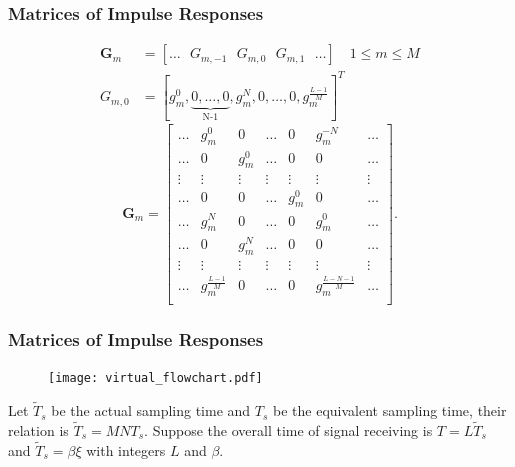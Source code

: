 \documentclass{beamer}
\begin{document}
\begin{frame}
\frametitle{Matrices of Impulse Responses}
\begin{align}
  \pmb{G}_m &=[\dots\text{ }G_{m,-1}\text{ }G_{m,0}\text{ }G_{m,1}\text{ }\dots]\quad 1\leq m\leq M \\
  G_{m,0} &=[g^0_m,\underbrace{0,\dots,0}_\text{N-1},g^N_m,0,\dots,0,g^{\frac{L-1}{M}}_m]^T
\end{align}
\begin{equation}
    \pmb{G}_m = \begin{bmatrix}
      \dots & g_m^0 & 0 & \dots & 0 & g_m^{-N} & \dots \\%
      \dots & 0 & g_m^0 & \dots & 0 & 0 & \dots \\%
      \vdots & \vdots & \vdots & \vdots & \vdots & \vdots & \vdots\\%
      \dots & 0 & 0 & \dots & g_m^0 & 0 & \dots \\%
      \dots & g_m^{N} & 0 & \dots & 0 & g_m^{0} & \dots \\%
      \dots & 0 & g_m^N & \dots & 0 & 0 & \dots \\%
      \vdots & \vdots & \vdots & \vdots & \vdots & \vdots & \vdots\\%
      \dots & g_m^{\frac{L-1}{M}} & 0 & \dots & 0 & g_m^{\frac{L-N-1}{M}} & \dots \\%
    \end{bmatrix}.
\end{equation}
\end{frame}

\begin{frame}
\frametitle{Matrices of Impulse Responses}
\begin{figure}
\texttt{[image: virtual\_flowchart.pdf]}
\end{figure}
Let $\tilde{T}_s$ be the actual sampling time and $T_s$ be the equivalent sampling time, their relation is $\tilde{T}_s=MNT_s$. Suppose the overall time of signal receiving is $T=L\tilde{T}_s$ and $\tilde{T}_s=\beta\xi$ with integers $L$ and $\beta$.
\end{frame}
\end{document}
